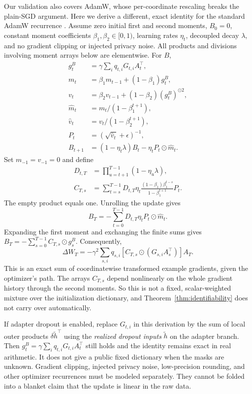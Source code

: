 \documentclass[11pt]{article}
\theoremstyle{plain}
\theoremstyle{definition}
\begin{document}
Our validation also covers AdamW, whose per-coordinate rescaling breaks the plain-SGD argument.
Here we derive a different, exact identity for the standard AdamW recurrence \citep{loshchilov2019decoupled}.
Assume zero initial first and second moments, $B_0=0$, constant moment coefficients $\beta_1,\beta_2\in[0,1)$, learning rates $\eta_t$, decoupled decay $\lambda$, and no gradient clipping or injected privacy noise.
All products and divisions involving moment arrays below are elementwise.
For $B$,
\begin{align}
g_t^B&=\gamma\sum_iq_{t,i}G_{t,i}A_t^\top,\\
m_t&=\beta_1m_{t-1}+(1-\beta_1)g_t^B,\\
v_t&=\beta_2v_{t-1}+(1-\beta_2)(g_t^B)^{\odot2},\\
\widehat m_t&=m_t/(1-\beta_1^{t+1}),\\
\widehat v_t&=v_t/(1-\beta_2^{t+1}),\\
P_t&=(\sqrt{\widehat v_t}+\epsilon)^{-1},\\
B_{t+1}&=(1-\eta_t\lambda)B_t-\eta_tP_t\odot\widehat m_t.
\label{eq:adamw_recurrence}
\end{align}
Set $m_{-1}=v_{-1}=0$ and define
\begin{align}
D_{t,T}&=\prod_{u=t+1}^{T-1}(1-\eta_u\lambda),\\
C_{T,s}&=\sum_{t=s}^{T-1}
D_{t,T}\eta_t\frac{(1-\beta_1)\beta_1^{t-s}}{1-\beta_1^{t+1}}P_t.
\label{eq:adamw_coefficients}
\end{align}
The empty product equals one.
Unrolling the update gives
\[
B_T=-\sum_{t=0}^{T-1}D_{t,T}\eta_tP_t\odot\widehat m_t.
\]
Expanding the first moment and exchanging the finite sums gives
$B_T=-\sum_{s=0}^{T-1}C_{T,s}\odot g_s^B$.
Consequently,
\begin{equation}
\boxed{\displaystyle
\Delta W_T=-\gamma^2\sum_{s,i}q_{s,i}
\left[C_{T,s}\odot(G_{s,i}A_s^\top)\right]A_T.}
\label{eq:adamw_superposition}
\end{equation}
This is an exact sum of coordinatewise transformed example gradients, given the optimizer's path.
The arrays $C_{T,s}$ depend nonlinearly on the whole gradient history through the second moments.
So this is not a fixed, scalar-weighted mixture over the initialization dictionary, and Theorem~\ref{thm:identifiability} does not carry over automatically.

If adapter dropout is enabled, replace $G_{t,i}$ in this derivation by the sum of local outer products $\delta\widetilde h^\top$ using the \emph{realized dropout inputs} $\widetilde h$ on the adapter branch.
Then $g_t^B=\gamma\sum_iq_{t,i}G_{t,i}A_t^\top$ still holds and the identity remains exact in real arithmetic.
It does not give a public fixed dictionary when the masks are unknown.
Gradient clipping, injected privacy noise, low-precision rounding, and other optimizer recurrences must be modeled separately. They cannot be folded into a blanket claim that the update is linear in the raw data.
\end{document}
